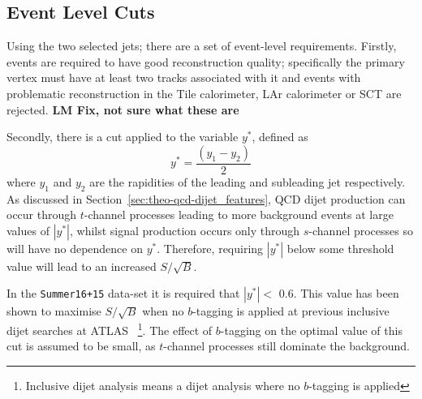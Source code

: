 
\subsection{Event Level Cuts}
\label{sec:evt-sel-event}

Using the two selected jets; there are a set of event-level requirements.
Firstly, events are required to have good reconstruction quality;
specifically the primary vertex
must have at least two tracks associated with it
and events with problematic reconstruction in the Tile calorimeter, LAr calorimeter or SCT are rejected.
\textbf{LM Fix, not sure what these are}

\noindent
Secondly, there is a cut applied to the variable $y^*$, defined as
\begin{equation}
  y^* = \frac{(y_1-y_2)}{2}
\end{equation}
where $y_1$ and $y_2$ are the rapidities of the leading and subleading jet respectively.
As discussed in Section~\ref{sec:theo-qcd-dijet_features}, QCD dijet production can occur through $t$-channel processes leading to more background events at large values of $|y^*|$,
whilst signal production occurs only through $s$-channel processes so will have no dependence on $y^*$.
Therefore, requiring $|y^*|$ below some threshold value will lead to an increased $S/\sqrt{B}$.

In the \verb|Summer16+15| data-set it is required that $|y^*| <$ 0.6.
This value has been shown to maximise $S/\sqrt{B}$ when no $b$-tagging is applied
at previous inclusive dijet searches at ATLAS~\cite{dijet-mori16_paper}
\footnote{Inclusive dijet analysis means a dijet analysis where no $b$-tagging is applied}.
The effect of $b$-tagging on the optimal value of this cut is assumed to be small,
as $t$-channel processes still dominate the background.

